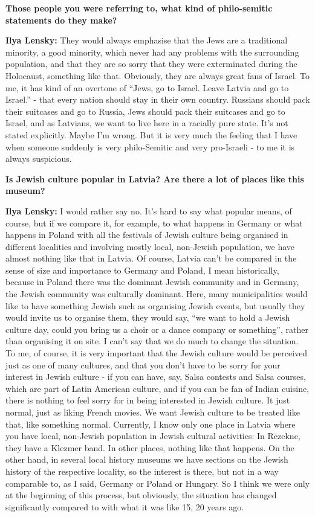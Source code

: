 \textbf{Those people you were referring to, what kind of philo-semitic statements do they make?} 

\textbf{Ilya Lensky:} They would always emphasise that the Jews are a traditional minority, a good minority, which never had any problems with the surrounding population, and that they are so sorry that they were exterminated during the Holocaust, something like that. Obviously, they are always great fans of Israel. To me, it has kind of an overtone of ``Jews, go to Israel. Leave Latvia and go to Israel.'' - that every nation should stay in their own country. Russians should pack their suitcases and go to Russia, Jews should pack their suitcases and go to Israel, and as Latvians, we want to live here in a racially pure state. It’s not stated explicitly. Maybe I’m wrong. But it is very much the feeling that I have when someone suddenly is very philo-Semitic and very pro-Israeli - to me it is always suspicious. 

\textbf{Is Jewish culture popular in Latvia? Are there a lot of places like this museum?}

\textbf{Ilya Lensky:} I would rather say no. It’s hard to say what popular means, of course, but if we compare it, for example, to what happens in Germany or what happens in Poland with all the festivals of Jewish culture being organised in different localities and involving mostly local, non-Jewish population, we have almost nothing like that in Latvia. Of course, Latvia can’t be compared in the sense of size and importance to Germany and Poland, I mean historically, because in Poland there was the dominant Jewish community and in Germany, the Jewish community was culturally dominant. Here, many municipalities would like to have something Jewish such as organising Jewish events, but usually they would invite us to organise them, they would say, ``we want to hold a Jewish culture day, could you bring us a choir or a dance company or something'', rather than organising it on site. I can’t say that we do much to change the situation. To me, of course, it is very important that the Jewish culture would be perceived just as one of many cultures, and that you don’t have to be sorry for your interest in Jewish culture - if you can have, say, Salsa contests and Salsa courses, which are part of Latin American culture, and if you can be fan of Indian cuisine, there is nothing to feel sorry for in being interested in Jewish culture. It just normal, just as liking French movies. We want Jewish culture to be treated like that, like something normal. Currently, I know only one place in Latvia where you have local, non-Jewish population in Jewish cultural activities: In Rēzekne, they have a Klezmer band. In other places, nothing like that happens. On the other hand, in several local history museums we have sections on the Jewish history of the respective locality, so the interest is there, but not in a way comparable to, as I said, Germany or Poland or Hungary. So I think we were only at the beginning of this process, but obviously, the situation has changed significantly compared to with what it was like 15, 20 years ago. 

